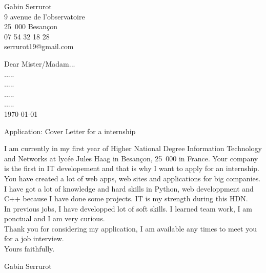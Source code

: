 \documentclass[11pt,a4paper,openany]{book}
\begin{document}
\begin{flushleft}
Gabin Serrurot\\
9 avenue de l'observatoire\\
25~000 Besançon\\
07 54 32 18 28\\
serrurot19@gmail.com\newline
\end{flushleft}

\medskip

\begin{flushright}
Dear Mister/Madam...\\
.....\\
.....\\
.....\\
.....\\
\today\\
\end{flushright}

\medskip

\begin{flushleft}
Application: Cover Letter for a internship \newline
\end{flushleft}

I am currently in my first year of Higher National Degree Information Technology and Networks at lycée Jules Haag in Besançon, 25~000 in France. Your company is the first in IT developement and that is why I want to apply for an internship.\newline
You have created a lot of web apps, web sites and applications for big companies.\\
I have got a lot of knowledge and hard skills in Python, web developpment and C++ because I have done some projects. IT is my strength during this HDN.\\
In previous jobs, I have developped lot of soft skills. I learned team work, I am ponctual and I am very curious.\\

Thank you for considering my application, I am available any times to meet you for a job interview.\\

Yours faithfully.\\

\begin{flushright}
Gabin Serrurot
\end{flushright}
\end{document}
